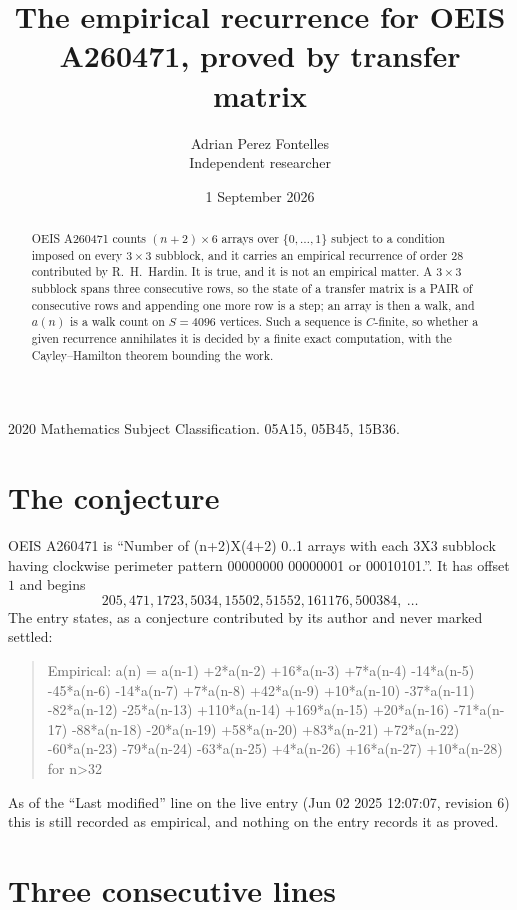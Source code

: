 \documentclass[11pt,a4paper]{article}
\title{The empirical recurrence for OEIS A260471, proved by transfer matrix}
\author{Adrian Perez Fontelles\\ \small Independent researcher}
\date{1 September 2026}
\theoremstyle{plain}
\theoremstyle{definition}
\begin{document}
\maketitle

\begin{abstract}
OEIS A260471 counts $(n+2)\times6$ arrays over $\{0,\dots,1\}$ subject to a condition imposed on
every $3\times3$ subblock, and it carries an empirical recurrence of order $28$
contributed by R.~H.~Hardin. It is true, and it is not an empirical matter. A $3\times3$
subblock spans three consecutive rows, so the state of a transfer matrix is a PAIR of
consecutive rows and appending one more row is a step; an array is then a walk, and
$a(n)$ is a walk count on $S=4096$ vertices. Such a sequence is $C$-finite, so whether a given
recurrence annihilates it is decided by a finite exact computation, with the Cayley--Hamilton
theorem bounding the work.
\end{abstract}

\noindent\small 2020 Mathematics Subject Classification. 05A15, 05B45, 15B36.\normalsize

\section{The conjecture}

OEIS A260471 is ``Number of (n+2)X(4+2) 0..1 arrays with each 3X3 subblock having clockwise perimeter pattern 00000000 00000001 or 00010101.''. It has offset $1$ and begins
\[
205, 471, 1723, 5034, 15502, 51552, 161176, 500384,\ \dots
\]
The entry states, as a conjecture contributed by its author and never marked settled:
\begin{quote}
Empirical: a(n) = a(n-1) +2*a(n-2) +16*a(n-3) +7*a(n-4) -14*a(n-5) -45*a(n-6) -14*a(n-7) +7*a(n-8) +42*a(n-9) +10*a(n-10) -37*a(n-11) -82*a(n-12) -25*a(n-13) +110*a(n-14) +169*a(n-15) +20*a(n-16) -71*a(n-17) -88*a(n-18) -20*a(n-19) +58*a(n-20) +83*a(n-21) +72*a(n-22) -60*a(n-23) -79*a(n-24) -63*a(n-25) +4*a(n-26) +16*a(n-27) +10*a(n-28) for n>32
\end{quote}
As of the ``Last modified'' line on the live entry (Jun 02 2025 12:07:07, revision 6) this is still
recorded as empirical, and nothing on the entry records it as proved.

\section{Three consecutive lines}
\end{document}
